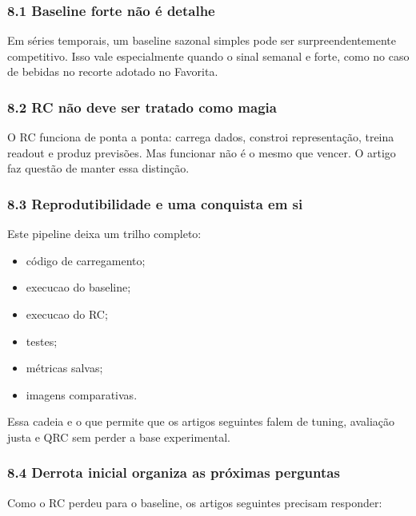 \documentclass[12pt]{article}
\providecommand{\tightlist}{%
          \setlength{\itemsep}{0pt}\setlength{\parskip}{0pt}}
\begin{document}
\subsubsection{8.1 Baseline forte não é detalhe}\label{81-baseline-forte-nuxe3o-uxe9-detalhe}

Em séries temporais, um baseline sazonal simples pode ser surpreendentemente competitivo. Isso vale especialmente quando o sinal semanal e forte, como no caso de bebidas no recorte adotado no Favorita.

\subsubsection{8.2 RC não deve ser tratado como magia}\label{82-rc-nuxe3o-deve-ser-tratado-como-magia}

O RC funciona de ponta a ponta: carrega dados, constroi representação, treina readout e produz previsões. Mas funcionar não é o mesmo que vencer. O artigo faz questão de manter essa distinção.

\subsubsection{8.3 Reprodutibilidade e uma conquista em si}\label{83-reprodutibilidade-e-uma-conquista-em-si}

Este pipeline deixa um trilho completo:

\begin{itemize}
\tightlist
\item
  código de carregamento;
\item
  execucao do baseline;
\item
  execucao do RC;
\item
  testes;
\item
  métricas salvas;
\item
  imagens comparativas.
\end{itemize}

Essa cadeia e o que permite que os artigos seguintes falem de tuning, avaliação justa e QRC sem perder a base experimental.

\subsubsection{8.4 Derrota inicial organiza as próximas perguntas}\label{84-derrota-inicial-organiza-as-pruxf3ximas-perguntas}

Como o RC perdeu para o baseline, os artigos seguintes precisam responder:
\end{document}

